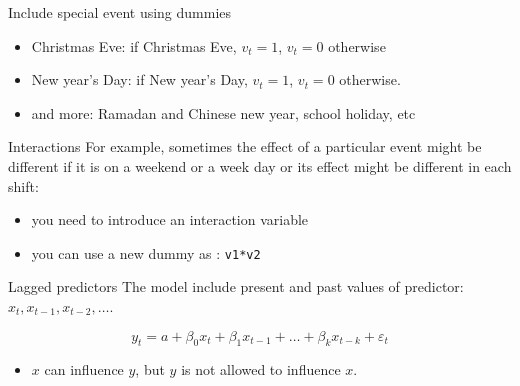 \documentclass[
  14pt,
  ignorenonframetext,
  aspectratio=169,
]{beamer}
\providecommand{\tightlist}{%
  \setlength{\itemsep}{0pt}\setlength{\parskip}{0pt}}
\begin{document}
\begin{frame}{Include special event using dummies}
\protect{}\label{include-special-event-using-dummies}
\begin{itemize}
\tightlist
\item
  Christmas Eve: if Christmas Eve, \(v_t=1\), \(v_t=0\) otherwise
\item
  New year's Day: if New year's Day, \(v_t=1\), \(v_t=0\) otherwise.
\item
  and more: Ramadan and Chinese new year, school holiday, etc
\end{itemize}
\end{frame}

\begin{frame}[fragile]{Interactions}
\protect{}\label{interactions}
For example, sometimes the effect of a particular event might be
different if it is on a weekend or a week day or its effect might be
different in each shift:

\begin{itemize}
\tightlist
\item
  you need to introduce an interaction variable
\item
  you can use a new dummy as : \texttt{v1*v2}
\end{itemize}
\end{frame}

\begin{frame}{Lagged predictors}
\protect{}\label{lagged-predictors}
The model include present and past values of predictor:
\(x_t,x_{t-1},x_{t-2},\dots.\)

\[
y_{t} = a + \beta_{0} x_{t} + \beta_{1} x_{t-1} + \dots + \beta_{k} x_{t-k} + \varepsilon_{t}
\]

\begin{itemize}
\tightlist
\item
  \(x\) can influence \(y\), but \(y\) is not allowed to influence
  \(x\).
\end{itemize}
\end{frame}
\end{document}
